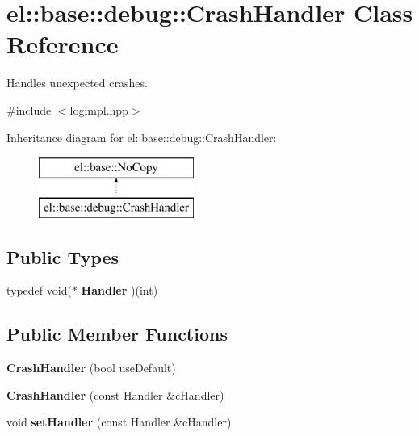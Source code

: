 \hypertarget{classel_1_1base_1_1debug_1_1CrashHandler}{\section{el\-:\-:base\-:\-:debug\-:\-:Crash\-Handler Class Reference}
\label{classel_1_1base_1_1debug_1_1CrashHandler}
}


Handles unexpected crashes.  




{\ttfamily \#include $<$logimpl.\-hpp$>$}

Inheritance diagram for el\-:\-:base\-:\-:debug\-:\-:Crash\-Handler\-:\begin{figure}[H]
\begin{center}
\leavevmode
\includegraphics[height=2.000000cm]{classel_1_1base_1_1debug_1_1CrashHandler}
\end{center}
\end{figure}
\subsection*{Public Types}
\begin{DoxyCompactItemize}
\item 
\hypertarget{classel_1_1base_1_1debug_1_1CrashHandler_a838ba8e9b1587affca2b6cba02379cf1}{typedef void($\ast$ {\bfseries Handler} )(int)}\label{classel_1_1base_1_1debug_1_1CrashHandler_a838ba8e9b1587affca2b6cba02379cf1}

\end{DoxyCompactItemize}
\subsection*{Public Member Functions}
\begin{DoxyCompactItemize}
\item 
\hypertarget{classel_1_1base_1_1debug_1_1CrashHandler_a1d1e1a77bb6c37b1fbb39ecf94b38983}{{\bfseries Crash\-Handler} (bool use\-Default)}\label{classel_1_1base_1_1debug_1_1CrashHandler_a1d1e1a77bb6c37b1fbb39ecf94b38983}

\item 
\hypertarget{classel_1_1base_1_1debug_1_1CrashHandler_a9fbf8df7a292fcbeabfb87b241c83f78}{{\bfseries Crash\-Handler} (const Handler \&c\-Handler)}\label{classel_1_1base_1_1debug_1_1CrashHandler_a9fbf8df7a292fcbeabfb87b241c83f78}

\item 
\hypertarget{classel_1_1base_1_1debug_1_1CrashHandler_abd1d3d1ad5f1de2d40c39dd0542c26d4}{void {\bfseries set\-Handler} (const Handler \&c\-Handler)}\label{classel_1_1base_1_1debug_1_1CrashHandler_abd1d3d1ad5f1de2d40c39dd0542c26d4}

\end{DoxyCompactItemize}


